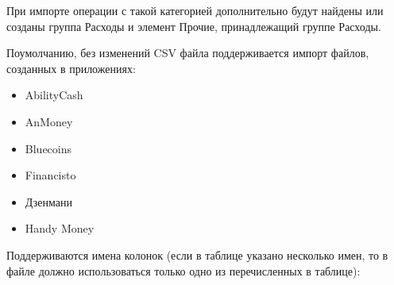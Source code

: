 \documentclass[a4paper,10pt,russian]{sphinxmanual}
\begin{document}
\sphinxAtStartPar
При импорте операции с такой категорией дополнительно будут найдены или созданы группа Расходы и элемент Прочие,
принадлежащий группе Расходы.

\sphinxAtStartPar
По\sphinxhyphen{}умолчанию, без изменений CSV файла поддерживается импорт файлов, созданных в приложениях:
\begin{itemize}
\item {} 
\sphinxAtStartPar
AbilityCash

\item {} 
\sphinxAtStartPar
AnMoney

\item {} 
\sphinxAtStartPar
Bluecoins

\item {} 
\sphinxAtStartPar
Financisto

\item {} 
\sphinxAtStartPar
Дзен\sphinxhyphen{}мани

\item {} 
\sphinxAtStartPar
Handy Money

\end{itemize}

\sphinxAtStartPar
Поддерживаются имена колонок (если в таблице указано несколько имен, то в файле должно
использоваться только одно из перечисленных в таблице):
\end{document}
